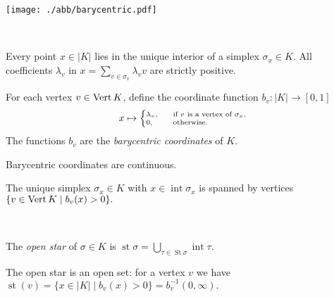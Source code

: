 \begin{multicols*}{3}
\begin{example}
\begin{center}
\vspace{-0.6pc}
\texttt{[image: ./abb/barycentric.pdf]}
\vspace{-0.5pc}
\end{center}
\end{example}
\rspace
\drawaline\\\vspace{-0.6pc}
\begin{rem}
Every point $x\in |K|$ lies in the unique interior of a simplex $\sigma_x \in K$. All coefficients $\lambda_v$ in 
$x = \sum_{v\in \sigma_x} \lambda_v v$
are strictly positive.  
\end{rem}
\rspace
\begin{definition}
For each vertex $v \in \operatorname{Vert} K$, define the coordinate function $b_v : |K|  \to [0,1]$ \vspace{-0.38pc}
\begin{equation*}
{\scriptsize
x \mapsto 
\begin{cases}
\lambda_v, \quad & \text{if }v \text{ is a vertex of  }\sigma_x, \vspace{-0.1pc} \\
0,\quad & \text{otherwise}.
\end{cases} }
\vspace{-0.38pc}
 \end{equation*}
The functions $b_v$ are the \emph{barycentric coordinates} of $K$.
 \end{definition}
 \rspace
 \begin{rem}
Barycentric coordinates are continuous.
 \end{rem}
 \rspace
  \begin{rem}
The unique simplex $\sigma_x \in K$ with $x \in \operatorname{int} \sigma_x$ is spanned by vertices
$
\{ v\in \operatorname{Vert} K \mid b_v(x) >0\}.
$
\end{rem}
\rspace
\drawaline\\\vspace{-0.7pc}
\begin{definition}
The \emph{open star} of $\sigma \in K$ is 
$
\operatorname{st} \sigma = \bigcup_{\tau \in \operatorname{St} \sigma} \operatorname{int} \tau.
$
\end{definition}
\rspace
\begin{rem}
The open star is an open set: for a vertex $v$ we have
$\operatorname{st}(v)  = \{x \in |K| \mid b_v(x)>0\} = b_v^{-1}(0,\infty).$
\end{rem}

\end{multicols*}
